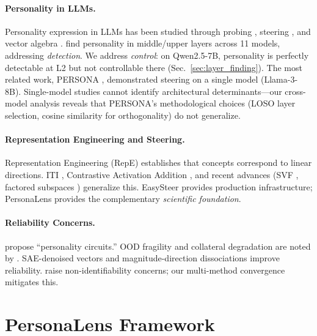 \documentclass{article}
\begin{document}
\paragraph{Personality in LLMs.}
Personality expression in LLMs has been studied through probing \citep{serapiogarcia2023personality, ju2025probing}, steering \citep{frising2025linear, feng2026persona, chen2025persona, bhandari2026activation}, and vector algebra \citep{feng2026persona, billy2025blending}. \citet{ju2025probing} find personality in middle/upper layers across 11 models, addressing \emph{detection}. We address \emph{control}: on Qwen2.5-7B, personality is perfectly detectable at L2 but not controllable there (Sec.~\ref{sec:layer_finding}). The most related work, PERSONA \citep{feng2026persona}, demonstrated steering on a single model (Llama-3-8B). Single-model studies cannot identify architectural determinants---our cross-model analysis reveals that PERSONA's methodological choices (LOSO layer selection, cosine similarity for orthogonality) do not generalize.

\paragraph{Representation Engineering and Steering.}
Representation Engineering (RepE) \citep{zou2023representation} establishes that concepts correspond to linear directions. ITI \citep{li2024iti}, Contrastive Activation Addition \citep{rimsky2024steering}, and recent advances (SVF \citep{svf2026}, factored subspaces \citep{factored2026}) generalize this. EasySteer \citep{xu2025easysteer} provides production infrastructure; PersonaLens provides the complementary \emph{scientific foundation}.

\paragraph{Reliability Concerns.}
\citet{bao2025traits2circuits} propose ``personality circuits.'' OOD fragility and collateral degradation are noted by \citet{cae2025}. SAE-denoised vectors \citep{sae2025denoising} and magnitude-direction dissociations \citep{direction2026} improve reliability. \citet{venkatesh2026nonidentifiability} raise non-identifiability concerns; our multi-method convergence mitigates this.

\section{PersonaLens Framework}\label{sec:method}
\end{document}
